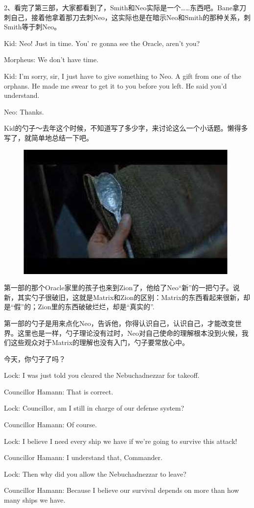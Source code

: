 \documentclass{ctexart}
\newenvironment{myquote}{\color{green} \setlength{\leftskip}{6em} \setlength{\rightskip}{4em} \setlength{\parindent}{-2em}}{\par}
\begin{document}
2、看完了第三部，大家都看到了，Smith和Neo实际是一个……东西吧。Bane拿刀刺自己，接着他拿着那刀去刺Neo，这实际也是在暗示Neo和Smith的那种关系，刺Smith等于刺Neo。

\begin{myquote}
Kid: Neo! Just in time. You' re gonna see the Oracle, aren't you?

Morpheus: We don't have time.

Kid: I'm sorry, sir, I just have to give something to Neo. A gift from one of the orphans. He made me swear to get it to you before you left. He said you'd understand.

Neo: Thanks.
\end{myquote}

Kid的勺子～去年这个时候，不知道写了多少字，来讨论这么一个小话题。懒得多写了，就简单地总结一下吧。

\begin{figure}[htb]
\centering
\includegraphics[width=0.5\linewidth]{fig/read_reloaded-54}
\end{figure}

第一部的那个Oracle家里的孩子也来到Zion了，他给了Neo“新”的一把勺子。说新，其实勺子很破旧，这就是Matrix和Zion的区别：Matrix的东西看起来很新，却是“假”的；Zion里的东西破破烂烂，却是“真实的”.

第一部的勺子是用来点化Neo，告诉他，你得认识自己，认识自己，才能改变世界。这里也是一样，勺子理论没有过时，Neo对自己使命的理解根本没到火候，我们这些观众对于Matrix的理解也没有入门，勺子要常放心中。

今天，你勺子了吗？

\begin{myquote}
Lock: I was just told you cleared the Nebuchadnezzar for takeoff.

Councillor Hamann: That is correct.

Lock: Councillor, am I still in charge of our defense system?

Councillor Hamann: Of course.

Lock: I believe I need every ship we have if we're going to survive this attack!

Councillor Hamann: I understand that, Commander.

Lock: Then why did you allow the Nebuchadnezzar to leave?

Councillor Hamann: Because I believe our survival depends on more than how many ships we have.
\end{myquote}
\end{document}

